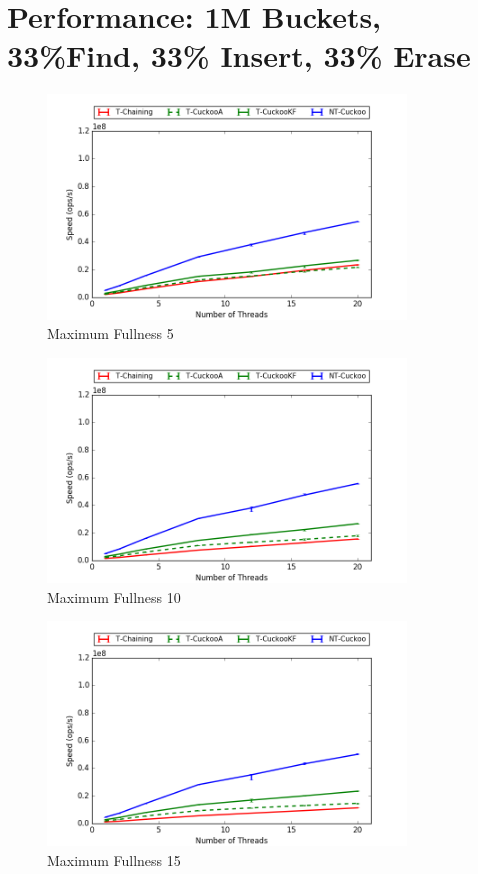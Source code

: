 \section{Performance: 1M Buckets, 33\%Find, 33\% Insert, 33\% Erase}
\begin{figure}[H]
    \centering
	\includegraphics[width=0.85\textwidth]{maps/5HM1M:F34,I33,E33.png} 
        \caption*{Maximum Fullness 5}
\end{figure}
\begin{figure}[H]
    \centering
	\includegraphics[width=0.85\textwidth]{maps/10HM1M:F34,I33,E33.png} 
        \caption*{Maximum Fullness 10}
\end{figure}
\begin{figure}[H]
    \centering
	\includegraphics[width=0.85\textwidth]{maps/15HM1M:F34,I33,E33.png} 
        \caption*{Maximum Fullness 15}
\end{figure}


